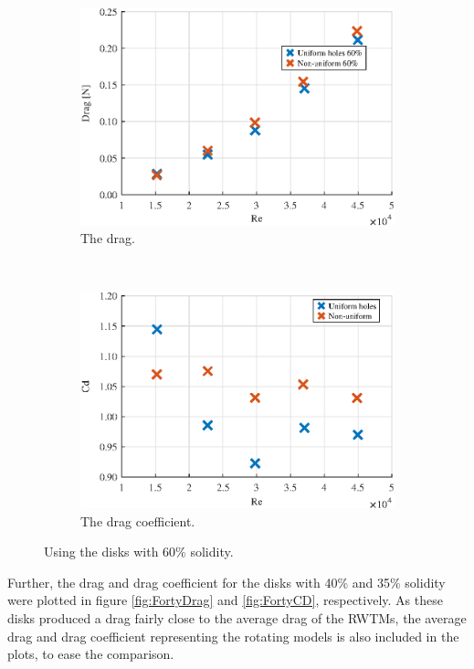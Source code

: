 \begin{figure} 
    \centering
    \begin{subfigure}[b]{0.45\linewidth}
        \includegraphics[width=\textwidth]{0_Images/SixtyDragRe.eps}
        \caption{The drag.}
        \label{Fig:SixtyDrag}
    \end{subfigure}
    ~
    \begin{subfigure}[b]{0.45\linewidth}
        \includegraphics[width=\textwidth]{0_Images/SixtyCDRe.eps}
        \caption{The drag coefficient.}
        \label{Fig:SixtyCD}
    \end{subfigure}
    \caption{Using the disks with 60\% solidity.}
    \label{fig:SixtyDisk}
\end{figure}

\FloatBarrier

Further, the drag and drag coefficient for the disks with 40\% and 35\% solidity were plotted in figure \ref{fig:FortyDrag} and \ref{fig:FortyCD}, respectively. As these disks produced a drag fairly close to the average drag of the \gls{RWTM}s, the average drag and drag coefficient representing the rotating models is also included in the plots, to ease the comparison. 

